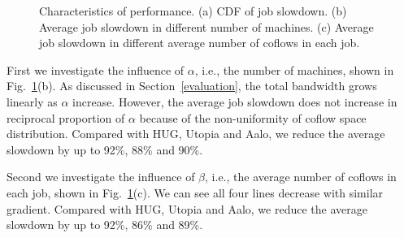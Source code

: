 \documentclass[10pt, conference, letterpaper]{IEEEtran}
\begin{document}
\begin{figure}[!t]
	\centering
	\hfil
	\hfil
	\caption{Characteristics of performance. (a) CDF of job slowdown. (b) Average job slowdown in different number of machines. (c) Average job slowdown in different average number of coflows in each job.}
	\label{f2}
\end{figure}

First we investigate the influence of $\alpha$, i.e., the number of machines, shown in Fig.~\ref{f2}(b). As discussed in Section~\ref{evaluation}, the total bandwidth grows linearly as $\alpha$ increase. However, the average job slowdown does not increase in reciprocal proportion of $\alpha$ because of the non-uniformity of coflow space distribution. Compared with HUG, Utopia and Aalo, we reduce the average slowdown by up to 92\%, 88\% and 90\%.

Second we investigate the influence of $\beta$, i.e., the average number of coflows in each job, shown in Fig.~\ref{f2}(c). We can see all four lines decrease with similar gradient. Compared with HUG, Utopia and Aalo, we reduce the average slowdown by up to 92\%, 86\% and 89\%.
\end{document}
